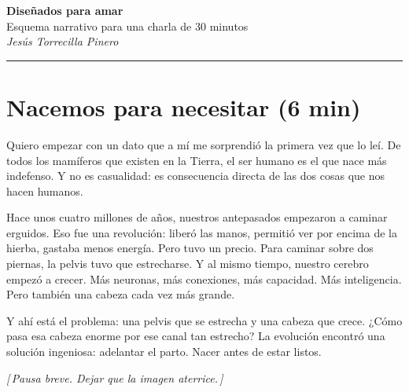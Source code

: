 \documentclass[a4paper, 11pt]{article}
\newcommand{\nota}[1]{%
  \par\smallskip
  {\small\itshape\color{oro!80!black} [\,#1\,]}%
  \par\smallskip
}
\begin{document}
\begin{center}
  {\sffamily\fontsize{22}{26}\selectfont\bfseries\color{noche}
    Diseñados para amar}\\[6pt]
  {\sffamily\large\color{gris}
    Esquema narrativo para una charla de 30 minutos}\\[4pt]
  {\sffamily\normalsize\color{gris}\itshape
    Jesús Torrecilla Pinero}
\end{center}

\vspace{0.8em}
\noindent\rule{\textwidth}{0.4pt}
\vspace{0.5em}


\vspace{1.2em}

\section{Nacemos para necesitar (6 min)}

Quiero empezar con un dato que a mí me sorprendió la primera vez que lo leí. De todos los mamíferos que existen en la Tierra, el ser humano es el que nace más indefenso. Y no es casualidad: es consecuencia directa de las dos cosas que nos hacen humanos.

Hace unos cuatro millones de años, nuestros antepasados empezaron a caminar erguidos. Eso fue una revolución: liberó las manos, permitió ver por encima de la hierba, gastaba menos energía. Pero tuvo un precio. Para caminar sobre dos piernas, la pelvis tuvo que estrecharse. Y al mismo tiempo, nuestro cerebro empezó a crecer. Más neuronas, más conexiones, más capacidad. Más inteligencia. Pero también una cabeza cada vez más grande.

Y ahí está el problema: una pelvis que se estrecha y una cabeza que crece. ¿Cómo pasa esa cabeza enorme por ese canal tan estrecho? La evolución encontró una solución ingeniosa: adelantar el parto. Nacer antes de estar listos.

\nota{Pausa breve. Dejar que la imagen aterrice.}
\end{document}
